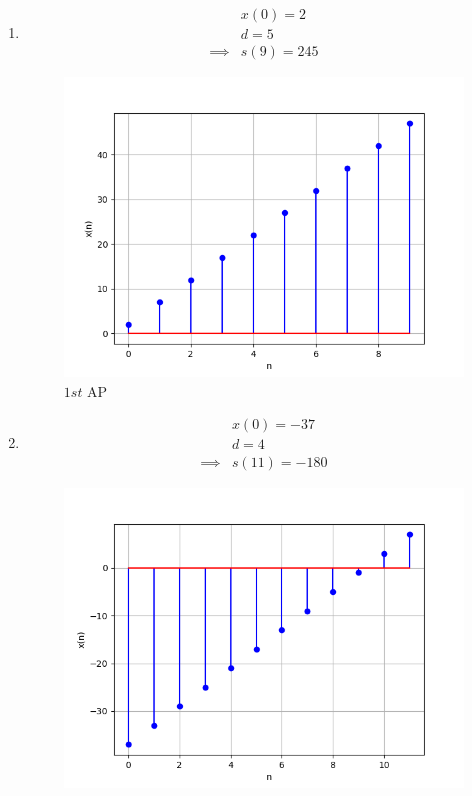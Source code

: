 \documentclass[journal,12pt,twocolumn]{IEEEtran}
\theoremstyle{remark}
\begin{document}
\begin{enumerate}[label=(\alph*)]
    \item \begin{align}
        &x(0)=2 \\
        &d=5 \\
        \implies &s(9)=245
    \end{align}
    \begin{figure}[h!]
        \centering
        \includegraphics[width=0.9\columnwidth]{figs/plt1.png}
        \caption{$1st$ AP}
    \end{figure}
    \item \begin{align}
        &x(0)=-37 \\
        &d=4 \\
        \implies &s(11)=-180
    \end{align}
    \begin{figure}[h!]
        \centering
        \includegraphics[width=0.9\columnwidth]{figs/plt2.png}

\end{figure}
\end{enumerate}
\end{document}
